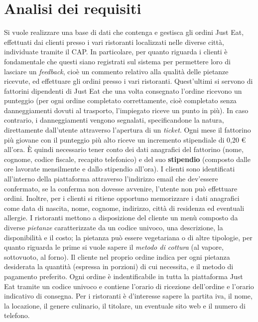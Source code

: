 \documentclass[10pt]{article}
\begin{document}
	\section{Analisi dei requisiti}
	Si vuole realizzare una base di dati che contenga e gestisca gli ordini Just Eat\texttrademark{}, effettuati dai clienti presso i vari ristoranti localizzati nelle diverse citt\`a, individuate tramite il CAP. In particolare, per quanto riguarda i clienti \`e fondamentale che questi siano registrati sul sistema per permettere loro di lasciare un \textit{feedback}, cio\`e un commento relativo alla qualit\`a delle pietanze ricevute, ed effettuare gli ordini presso i vari ristoranti. Quest'ultimi si servono di fattorini\footnotemark{} dipendenti di Just Eat\texttrademark{} che una volta consegnato l'ordine ricevono un punteggio (per ogni ordine completato correttamente, cio\`e completato senza danneggiamenti dovuti al trasporto, l'impiegato riceve un punto in più). In caso contrario, i danneggiamenti vengono segnalati, specificandone la natura, direttamente dall'utente attraverso l'apertura di un \textit{ticket}. Ogni mese il fattorino più giovane con il punteggio più alto riceve un incremento stipendiale di 0,20 \euro{} all'ora. \`E quindi necessario tener conto dei dati anagrafici del fattorino (nome, cognome, codice fiscale, recapito telefonico) e del suo \textbf{stipendio} (composto dalle ore lavorate mensilmente e dallo stipendio all'ora). I clienti sono identificati all'interno della piattaforma attraverso l'indirizzo email che dev'essere confermato, se la conferma non dovesse avvenire, l'utente non può effettuare ordini. Inoltre, per i clienti si ritiene opportuno memorizzare i dati anagrafici come data di nascita, nome, cognome, indirizzo, citt\`a di residenza ed eventuali allergie. I ristoranti mettono a disposizione del cliente un men\`u composto da diverse \textit{pietanze} caratterizzate da un codice univoco, una descrizione, la disponibilit\`a e il costo; la pietanza può essere vegetariana o di altre tipologie, per quanto riguarda le prime si vuole sapere il \textit{metodo di cottura} (al vapore, sottovuoto, al forno). Il cliente nel proprio ordine indica per ogni pietanza desiderata la quantit\`a (espressa in porzioni) di cui necessita, e il metodo di pagamento preferito. Ogni ordine \`e indentificabile in tutta la piattaforma Just Eat\texttrademark{} tramite un codice univoco e contiene l'orario di ricezione dell'ordine e l'orario indicativo di consegna. Per i ristoranti \`e d'interesse sapere la partita iva, il nome, la locazione, il genere culinario, il titolare, un eventuale sito web e il numero di telefono.
\end{document}
